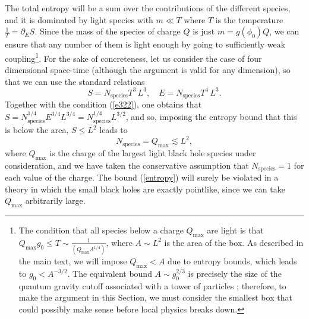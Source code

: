 \documentclass[11pt]{article}
\numberwithin{equation}{section}
\newcommand{\eq}[1]{(\ref{#1})}
\numberwithin{equation}{section}
\theoremstyle{remark}
\begin{document}
The total entropy will be a sum over the contributions of the different species, %
and it is dominated by light species with $m\ll T$ where $T$ is the temperature $\frac{1}{T}=\partial_ES$. 
Since the mass of the species of charge $Q$ is just $m=g(\phi_0) Q$, we can ensure that any number of them is light enough by going to sufficiently weak coupling\footnote{The condition that all species below a charge $Q_{\text{max}}$ are light is that $Q_{\text{max}} g_0 \leq T\sim\frac{1}{(Q_{\text{max}} A^{1/4})}$, where $A\sim L^2$ is the area of the box. As described in the main text, we will impose $Q_{\text{max}}<A$ due to entropy bounds, which leads to $g_0<A^{-3/2}$. The equivalent bound $A\sim g_0^{2/3}$ is precisely the size of the quantum gravity cutoff associated with a tower of particles \cite{Heidenreich:2017sim,Grimm:2018ohb}; therefore, to make the argument in this Section, we must consider the smallest box that could possibly make sense before local physics breaks down.}. For the sake of concreteness, let us consider the case of four dimensional space-time (although the argument is valid for any dimension), so that we can 
 use the standard relations 
 \begin{equation} S=N_{\text{species}} T^3\, L^3,\quad E= N_{\text{species}}T^4\, L^3.\end{equation}
Together with the condition \eq{e322}, one obtains that $S=N_{\text{species}}^{1/4}E^{3/4}L^{3/4}=N_{\text{species}}^{1/4} L^{3/2}$, and so, imposing the entropy bound that this is below the area, $S\leq L^2$ leads to
\begin{equation} N_{\text{species}}=Q_{\text{max}}\lesssim L^2, \label{entropy}\end {equation}
where $Q_{\text{max}}$ is the charge of the largest light black hole species under consideration, and we have taken the conservative assumption that $N_{\text{species}}=1$ for each value of the charge. The bound \eq{entropy} will surely be violated in a theory in which the small black holes are exactly pointlike, since we can take $Q_{\text{max}}$ arbitrarily large.
\end{document}
